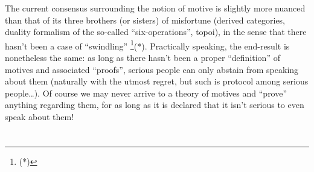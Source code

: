 The current consensus surrounding the notion of motive is slightly more nuanced than 
that of its three brothers (or sisters)
of misfortune (derived categories, duality formalism of the so-called
``six-operations'', topoi), 
in the sense that there hasn't been a case of ``swindling''
\footnote{(*)}(*). 
Practically speaking, the end-result is nonetheless the same: as long as there hasn't been
a proper ``definition'' of motives and associated ``proofs'', serious people can only
abstain from speaking about them
(naturally with the utmost regret, but such is protocol among serious people\ldots).
Of course we may never arrive to a theory of motives and ``prove'' anything regarding them,
for as long as it is declared that it isn't serious to even speak about them! 




\label{note:46.1}
\label{note:46.2}
\label{note:46.3}
\label{note:46.4}
\label{note:46.5}
\label{note:46.6}
\label{note:46.7}
\label{note:46.8}
\label{note:46.9}

\subsection{}

\label{note:47}
\label{note:47.1}
\label{note:47.2}
\label{note:47.3}

\section{}

\subsection{}

\label{note:48}
\label{note:48.1}
\label{note:48.2}

\subsection{}

\label{note:48'}

\subsection{}

\label{note:49}

\subsection{}

\label{note:50}


